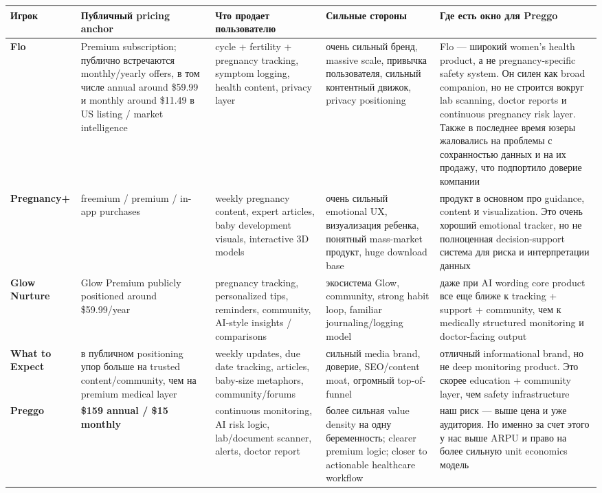 \documentclass[10pt,a4paper]{article}
\begin{document}
\begin{center}
\renewcommand{\arraystretch}{1.25}
\begin{tabularx}{\textwidth}{|p{2.4cm}|p{2.5cm}|p{3.3cm}|p{3.4cm}|X|}
\hline
\rowcolor{lightblue}
\textbf{Игрок} & \textbf{Публичный pricing anchor} & \textbf{Что продает пользователю} & \textbf{Сильные стороны} & \textbf{Где есть окно для Preggo} \\
\hline
\textbf{Flo} & Premium subscription; публично встречаются monthly/yearly offers, в том числе annual around \$59.99 и monthly around \$11.49 в US listing / market intelligence & cycle + fertility + pregnancy tracking, symptom logging, health content, privacy layer & очень сильный бренд, massive scale, привычка пользователя, сильный контентный движок, privacy positioning & Flo --- широкий women’s health product, а не pregnancy-specific safety system. Он силен как broad companion, но не строится вокруг lab scanning, doctor reports и continuous pregnancy risk layer. Также в последнее время юзеры жаловались на проблемы с сохранностью данных и на их продажу, что подпортило доверие компании \\
\hline
\textbf{Pregnancy+} & freemium / premium / in-app purchases & weekly pregnancy content, expert articles, baby development visuals, interactive 3D models & очень сильный emotional UX, визуализация ребенка, понятный mass-market продукт, huge download base & продукт в основном про guidance, content и visualization. Это очень хороший emotional tracker, но не полноценная decision-support система для риска и интерпретации данных \\
\hline
\textbf{Glow Nurture} & Glow Premium publicly positioned around \$59.99/year & pregnancy tracking, personalized tips, reminders, community, AI-style insights / comparisons & экосистема Glow, community, strong habit loop, familiar journaling/logging model & даже при AI wording core product все еще ближе к tracking + support + community, чем к medically structured monitoring и doctor-facing output \\
\hline
\textbf{What to Expect} & в публичном positioning упор больше на trusted content/community, чем на premium medical layer & weekly updates, due date tracking, articles, baby-size metaphors, community/forums & сильный media brand, доверие, SEO/content moat, огромный top-of-funnel & отличный informational brand, но не deep monitoring product. Это скорее education + community layer, чем safety infrastructure \\
\hline
\textbf{Preggo} & \textbf{\$159 annual / \$15 monthly} & continuous monitoring, AI risk logic, lab/document scanner, alerts, doctor report & более сильная value density на одну беременность; clearer premium logic; closer to actionable healthcare workflow & наш риск --- выше цена и уже аудитория. Но именно за счет этого у нас выше ARPU и право на более сильную unit economics модель \\
\hline
\end{tabularx}
\end{center}
\end{document}
